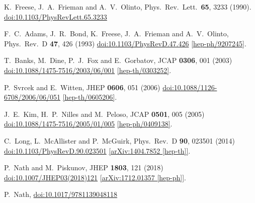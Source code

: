 \documentclass[11pt]{article}
\begin{document}
\begin{thebibliography}{99}
  K.~Freese, J.~A.~Frieman and A.~V.~Olinto,
  Phys.\ Rev.\ Lett.\  {\bf 65}, 3233 (1990).
  \href{https://dx.doi.org/10.1103/PhysRevLett.65.3233}{doi:10.1103/PhysRevLett.65.3233}

  F.~C.~Adams, J.~R.~Bond, K.~Freese, J.~A.~Frieman and A.~V.~Olinto,
  Phys.\ Rev.\ D {\bf 47}, 426 (1993)
  \href{https://dx.doi.org/10.1103/PhysRevD.47.426}{doi:10.1103/PhysRevD.47.426}
  \href{https://arxiv.org/abs/hep-ph/9207245}{[hep-ph/9207245]}.

  T.~Banks, M.~Dine, P.~J.~Fox and E.~Gorbatov,
  JCAP {\bf 0306}, 001 (2003)
  \href{https://dx.doi.org/10.1088/1475-7516/2003/06/001}{doi:10.1088/1475-7516/2003/06/001}
  \href{https://arxiv.org/abs/hep-th/0303252}{[hep-th/0303252]}.

  P.~Svrcek and E.~Witten,
  JHEP {\bf 0606}, 051 (2006)
  \href{https://dx.doi.org/10.1088/1126-6708/2006/06/051}{doi:10.1088/1126-6708/2006/06/051}
  \href{https://arxiv.org/abs/hep-th/0605206}{[hep-th/0605206]}.

  J.~E.~Kim, H.~P.~Nilles and M.~Peloso,
  JCAP {\bf 0501}, 005 (2005)
  \href{https://dx.doi.org/10.1088/1475-7516/2005/01/005}{doi:10.1088/1475-7516/2005/01/005}
  \href{https://arxiv.org/abs/hep-ph/0409138}{[hep-ph/0409138]}.

  C.~Long, L.~McAllister and P.~McGuirk,
  Phys.\ Rev.\ D {\bf 90}, 023501 (2014)
  \href{https://dx.doi.org/10.1103/PhysRevD.90.023501}{doi:10.1103/PhysRevD.90.023501}
  \href{https://arxiv.org/abs/1404.7852}{[arXiv:1404.7852 [hep-th]]}.

  P.~Nath and M.~Piskunov,
  JHEP {\bf 1803}, 121 (2018)
  \href{https://dx.doi.org/10.1007/JHEP03(2018)121}{doi:10.1007/JHEP03(2018)121}
  \href{https://arxiv.org/abs/1712.01357}{[arXiv:1712.01357 [hep-ph]]}.

  P.~Nath,
  \href{https://dx.doi.org/10.1017/9781139048118}{doi:10.1017/9781139048118}


\end{thebibliography}
\end{document}
